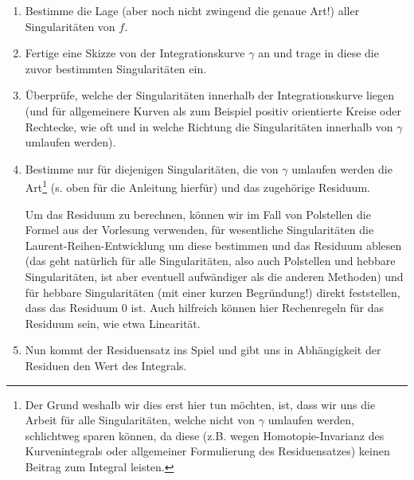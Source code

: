 \documentclass{article}
\theoremstyle{plain}
\theoremstyle{definition}
\begin{document}
\begin{tcolorbox}
	\begin{enumerate}
		\item Bestimme die Lage (aber noch nicht zwingend die genaue Art!) aller Singularitäten von $f$.
		\item Fertige eine Skizze von der Integrationskurve $\gamma$ an und trage in diese die zuvor bestimmten Singularitäten ein.
		\item Überprüfe, welche der Singularitäten innerhalb der Integrationskurve liegen (und für allgemeinere Kurven als zum Beispiel positiv orientierte Kreise oder Rechtecke, wie oft und in welche Richtung die Singularitäten innerhalb von $\gamma$ umlaufen werden).
		\item Bestimme nur für diejenigen Singularitäten, die von $\gamma$ umlaufen werden die Art\footnote{Der Grund weshalb wir dies erst hier tun möchten, ist, dass wir uns die Arbeit für alle Singularitäten, welche nicht von $\gamma$ umlaufen werden, schlichtweg sparen können, da diese (z.B. wegen Homotopie-Invarianz des Kurvenintegrals oder allgemeiner Formulierung des Residuensatzes) keinen Beitrag zum Integral leisten.} (s. oben für die Anleitung hierfür) und das zugehörige Residuum.

		      Um das Residuum zu berechnen, können wir im Fall von Polstellen die Formel aus der Vorlesung verwenden, für wesentliche Singularitäten die Laurent-Reihen-Entwicklung um diese bestimmen und das Residuum ablesen (das geht natürlich für alle Singularitäten, also auch Polstellen und hebbare Singularitäten, ist aber eventuell aufwändiger als die anderen Methoden) und für hebbare Singularitäten (mit einer kurzen Begründung!) direkt feststellen, dass das Residuum $0$ ist.
		      Auch hilfreich können hier Rechenregeln für das Residuum sein, wie etwa Linearität.
		\item Nun kommt der Residuensatz ins Spiel und gibt uns in Abhängigkeit der Residuen den Wert des Integrals.
	\end{enumerate}
\end{tcolorbox}
\end{document}
